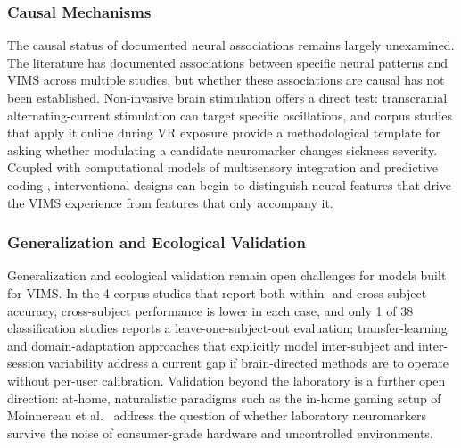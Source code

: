 \subsubsection{Causal Mechanisms}
The causal status of documented neural associations remains largely unexamined.
The literature has documented associations between specific neural patterns and VIMS across multiple studies, but whether these associations are causal has not been established.
Non-invasive brain stimulation offers a direct test: transcranial alternating-current stimulation can target specific oscillations, and corpus studies that apply it online during VR exposure \cite{liReducedVRMotion2024, benelliFrequencyDependentReductionCybersickness2023} provide a methodological template for asking whether modulating a candidate neuromarker changes sickness severity.
Coupled with computational models of multisensory integration and predictive coding \cite{nurnbergerMismatchVisualVestibularInformation2021}, interventional designs can begin to distinguish neural features that drive the VIMS experience from features that only accompany it.

\subsubsection{Generalization and Ecological Validation}
Generalization and ecological validation remain open challenges for models built for VIMS.
In the 4 corpus studies that report both within- and cross-subject accuracy, cross-subject performance is lower in each case, and only 1 of 38 classification studies reports a leave-one-subject-out evaluation; transfer-learning and domain-adaptation approaches that explicitly model inter-subject and inter-session variability address a current gap if brain-directed methods are to operate without per-user calibration.
Validation beyond the laboratory is a further open direction: at-home, naturalistic paradigms such as the in-home gaming setup of Moinnereau et al.~\cite{moinnereauInstrumentingVirtualReality2022} address the question of whether laboratory neuromarkers survive the noise of consumer-grade hardware and uncontrolled environments.

